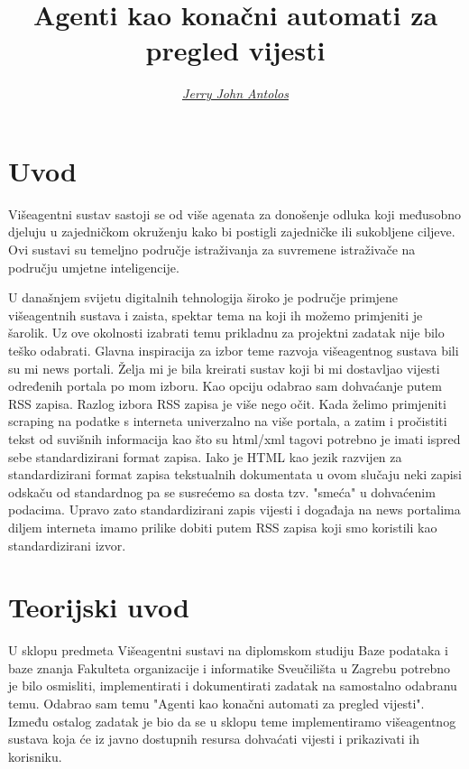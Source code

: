 \documentclass[]{foi} %
\title{Agenti kao konačni automati za pregled vijesti}
\author{{\href{https://github.com/jantolos/MASproject_2022}{\textit{\underline{Jerry John Antolos}}}}} %
\begin{document}
\maketitle

\tableofcontents

\makeatletter {} \makeatother
\pagestyle{plain}



\chapter{Uvod}
Višeagentni sustav sastoji se od više agenata za donošenje odluka koji međusobno djeluju u zajedničkom okruženju kako bi postigli zajedničke ili sukobljene ciljeve. Ovi sustavi su temeljno područje istraživanja za suvremene istraživače na području umjetne inteligencije. \cite{noauthor_multi-agent_nodate}

U današnjem svijetu digitalnih tehnologija široko je područje primjene višeagentnih sustava i zaista, spektar tema na koji ih možemo primjeniti je šarolik. Uz ove okolnosti izabrati temu prikladnu za projektni zadatak nije bilo teško odabrati. Glavna inspiracija za izbor teme razvoja višeagentnog sustava bili su mi news portali. Želja mi je bila kreirati sustav koji bi mi dostavljao vijesti određenih portala po mom izboru. Kao opciju odabrao sam dohvaćanje putem RSS zapisa. Razlog izbora RSS zapisa je više nego očit. Kada želimo primjeniti scraping na podatke s interneta univerzalno na više portala, a zatim i pročistiti tekst od suvišnih informacija kao što su html/xml tagovi potrebno je imati ispred sebe standardizirani format zapisa. Iako je HTML kao jezik razvijen za standardizirani format zapisa tekstualnih dokumentata u ovom slučaju neki zapisi odskaču od standardnog pa se susrećemo sa dosta tzv. "smeća" u dohvaćenim podacima. Upravo zato standardizirani zapis vijesti i događaja na news portalima diljem interneta imamo prilike dobiti putem RSS zapisa koji smo koristili kao standardizirani izvor.

\chapter{Teorijski uvod}
U sklopu predmeta Višeagentni sustavi na diplomskom studiju Baze podataka i baze znanja Fakulteta organizacije i informatike Sveučilišta u Zagrebu potrebno je bilo osmisliti, implementirati i dokumentirati zadatak na samostalno odabranu temu. Odabrao sam temu "Agenti kao konačni automati za pregled vijesti". Između ostalog zadatak je bio da se u sklopu teme implementiramo višeagentnog sustava koja će iz javno dostupnih resursa dohvaćati vijesti i prikazivati ih korisniku.
\end{document}
